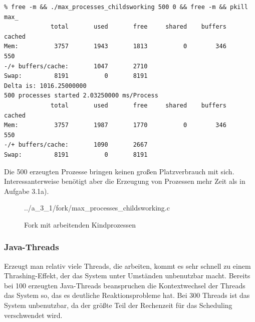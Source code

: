 \documentclass[a4paper,
12pt,
BCOR12mm,
]{scrartcl}
\begin{document}
\begin{verbatim}
% free -m && ./max_processes_childsworking 500 0 && free -m && pkill max_
             total       used       free     shared    buffers     cached
Mem:          3757       1943       1813          0        346        550
-/+ buffers/cache:       1047       2710
Swap:         8191          0       8191
Delta is: 1016.25000000
500 processes started 2.03250000 ms/Process
             total       used       free     shared    buffers     cached
Mem:          3757       1987       1770          0        346        550
-/+ buffers/cache:       1090       2667
Swap:         8191          0       8191
\end{verbatim}
Die 500 erzeugten Prozesse bringen keinen großen Platzverbrauch mit sich.
Interessanterweise benötigt aber die Erzeugung von Prozessen mehr Zeit als in Aufgabe
3.1a).
\begin{figure}[h!]
	\begin{center}
		 {../a_3_1/fork/max_processes_childsworking.c}
	\end{center}
	\caption{Fork mit arbeitenden Kindprozessen}
	\label{fig:fork_childsworking_listing}
\end{figure}

\subsubsection*{Java-Threads}
Erzeugt man relativ viele Threads, die arbeiten, kommt es sehr schnell zu einem Thrashing-Effekt, der das System
unter Umständen unbenutzbar macht. Bereits bei 100 erzeugten Java-Threads beanspruchen die Kontextwechsel der Threads
das System so, das es deutliche Reaktionsprobleme hat. Bei 300 Threads ist das System unbenutzbar, da der größte Teil
der Rechenzeit für das Scheduling verschwendet wird.
\end{document}

